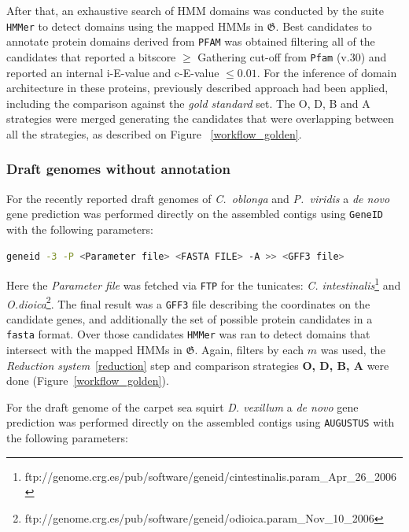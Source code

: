 \documentclass[11pt]{article}
\begin{document}
After that, an exhaustive search of HMM domains was conducted by the suite 
\texttt{HMMer} to detect domains using the mapped HMMs in 
$\boldsymbol{\mathfrak{G}}$. Best candidates to annotate protein domains 
derived from \texttt{PFAM} was obtained filtering all of the candidates that 
reported a bitscore $\geq$ Gathering cut-off from \texttt{Pfam} (v.30) and 
reported an internal i-E-value and c-E-value $\leq 0.01$. For the inference of 
domain architecture in these proteins, previously described approach had been 
applied, including the comparison against the \textsl{gold standard} set. The O, 
D, B and A strategies were merged generating the candidates that were 
overlapping between all the strategies, as described on Figure 
~\ref{workflow_golden}.

\subsubsection*{Draft genomes without annotation}

For the recently reported draft genomes of \textit{C.\ oblonga} and 
\textit{P.\ viridis} a \textit{de novo} gene prediction was performed 
directly on the assembled contigs using \texttt{GeneID}\cite{Blanco:2007} 
with the following parameters:

\begin{lstlisting}[language=bash, breaklines=true]
geneid -3 -P <Parameter file> <FASTA FILE> -A >> <GFF3 file>
\end{lstlisting}

Here the \textit{Parameter file} was fetched via \texttt{FTP} for the tunicates: \textsl{C. intestinalis}\footnote{ftp://genome.crg.es/pub/software/geneid/cintestinalis.param\_Apr\_26\_2006} and 
\textsl{O.dioica}\footnote{ftp://genome.crg.es/pub/software/geneid/odioica.param\_Nov\_10\_2006}.
The final result was a \texttt{GFF3} file describing the coordinates on the 
candidate genes, and additionally the set of possible protein candidates in a 
\texttt{fasta} format. Over those candidates \texttt{HMMer} was ran to detect 
domains that intersect with the mapped HMMs in $\boldsymbol{\mathfrak{G}}$. 
Again, filters by each $m$ was used, the \textsl{Reduction 
system}~\ref{reduction} step and comparison strategies \textbf{O, D, B, A} were 
done (Figure~\ref{workflow_golden}).

For the draft genome of the carpet sea squirt \textit{D. vexillum} 
\cite{velandia2016a} a \textit{de novo} gene prediction was performed 
directly on the assembled contigs using \texttt{AUGUSTUS} \cite{augustus} 
with the following parameters:
\end{document}
